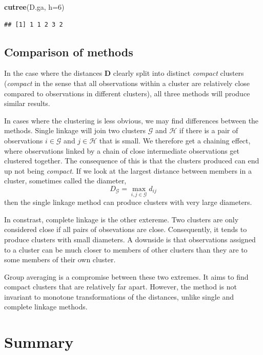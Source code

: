 \documentclass[
]{book}
\newenvironment{Shaded}{\begin{snugshade}}{\end{snugshade}}
\newcommand{\AttributeTok}[1]{\textcolor[rgb]{0.13,0.29,0.53}{#1}}
\newcommand{\DecValTok}[1]{\textcolor[rgb]{0.00,0.00,0.81}{#1}}
\newcommand{\FunctionTok}[1]{\textcolor[rgb]{0.13,0.29,0.53}{\textbf{#1}}}
\newcommand{\NormalTok}[1]{#1}
\theoremstyle{definition}
\theoremstyle{definition}
\theoremstyle{definition}
\theoremstyle{definition}
\theoremstyle{remark}
\begin{document}
\begin{Shaded}
\begin{Highlighting}[]
\FunctionTok{cutree}\NormalTok{(D.ga, }\AttributeTok{h=}\DecValTok{6}\NormalTok{)}
\end{Highlighting}
\end{Shaded}

\begin{verbatim}
## [1] 1 1 2 3 2
\end{verbatim}

\subsection{Comparison of methods}\label{comparison-of-methods}

In the case where the distances \(\mathbf D\) clearly split into distinct \emph{compact} clusters (\emph{compact} in the sense that all observations within a cluster are relatively close compared to observations in different clusters), all three methods will produce similar results.

In cases where the clustering is less obvious, we may find differences between the methods. Single linkage will join two clusters \(\mathcal{G}\) and \(\mathcal{H}\) if there is a pair of observations \(i\in \mathcal{G}\) and \(j \in \mathcal{H}\) that is small. We therefore get a chaining effect, where observations linked by a chain of close intermediate observations get clustered together. The consequence of this is that the clusters produced can end up not being \emph{compact}. If we look at the largest distance between members in a cluster, sometimes called the diameter,
\[D_\mathcal{G}= \max_{i,j \in \mathcal{G}} d_{ij}\]
then the single linkage method can produce clusters with very large diameters.

In constrast, complete linkage is the other extereme. Two clusters are only considered close if all pairs of obsevations are close. Consequently, it tends to produce clusters with small diameters. A downside is that observations assigned to a cluster can be much closer to members of other clusters than they are to some members of their own cluster.

Group averaging is a compromise between these two extremes. It aims to find compact clusters that are relatively far apart. However, the method is not invariant to monotone transformations of the distances, unlike single and complete linkage methods.

\section{Summary}\label{summary}
\end{document}
